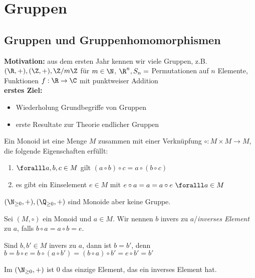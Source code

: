 \chapter{Gruppen}\lecture

\section{Gruppen und Gruppenhomomorphismen}

\textbf{Motivation:} aus dem ersten Jahr kennen wir viele Gruppen, z.B. $(\R,+), (\Z,+), \Z/m\Z$ für $m \in \N$, $\R^n, S_n = $ Permutationen auf $n$ Elemente, Funktionen $f: \R \to \C$ mit punktweiser Addition\\
\textbf{erstes Ziel:}
    \begin{itemize}
        \item Wiederholung Grundbegriffe von Gruppen
        \item erste Resultate zur Theorie endlicher Gruppen
    \end{itemize}

\begin{defn*}[Monoid]
    Ein Monoid ist eine Menge $M$ zusammen mit einer Verknüpfung $\circ: M \times M \to M$, die folgende Eigenschaften erfüllt:
    \begin{enumerate}[label={\roman*})]
        \item $\foralll a,b,c \in M$ gilt $(a \circ b) \circ c = a \circ (b \circ c)$
        \item es gibt ein Einselement $e \in M$ mit $e \circ a = a = a \circ e \ \foralll a \in M$
    \end{enumerate}
\end{defn*}

\begin{rem*}
	$ (\N_{\geq 0},+),(\Q_{\geq 0},+) $ sind Monoide aber keine Gruppe.
\end{rem*}

\begin{defn*}[Inverselemente]
	Sei $ (M,\circ) $ ein Monoid und $a \in M$. Wir nennen $b$ invers zu $a$/\emph{inverses Element} zu $a$, falls $b \circ a = a \circ b = e$.
\end{defn*}

\begin{rem*}
	Sind $b, b' \in M$ invers zu $a$, dann ist $b = b'$, denn $b = b \circ e = b \circ (a \circ b') = (b \circ a) \circ b' = e \circ b' = b'$
\end{rem*}

\begin{exmp*}
	Im $ (\N_{\geq 0},+) $ ist 0 das einzige Element, das ein inverses Element hat.
\end{exmp*}